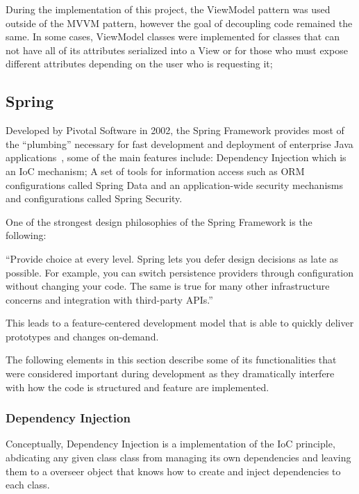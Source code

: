 During the implementation of this project, the ViewModel pattern was used outside of the \gls{MVVM} pattern, however the goal of decoupling code remained the same. In some cases, ViewModel classes were implemented for classes that can not have all of its attributes serialized into a View or for those who must expose different attributes depending on the user who is requesting it; 

\subsection{Spring}\label{concept:spring}
Developed by Pivotal Software in 2002, the Spring Framework provides most of the ``plumbing'' necessary for fast development and deployment of enterprise Java applications~\cite{springdocs}, some of the main features include: Dependency Injection which is an \gls{IoC} mechanism; A set of tools for information access such as \gls{ORM} configurations called Spring Data and an application-wide security mechanisms and configurations called Spring Security.

One of the strongest design philosophies of the Spring Framework is the following:
\begin{displayquote}
``Provide choice at every level. Spring lets you defer design decisions as late as possible. For example, you can switch persistence providers through configuration without changing your code. The same is true for many other infrastructure concerns and integration with third-party \gls{API}s.''~\textcite{springdocs}
\end{displayquote}
This leads to a feature-centered development model that is able to quickly deliver prototypes and changes on-demand.

The following elements in this section describe some of its functionalities that were considered important during development as they dramatically interfere with how the code is structured and feature are implemented.

\subsubsection{Dependency Injection}\label{spring:ds}
Conceptually, Dependency Injection is a implementation of the \gls{IoC} principle, abdicating any given class class from managing its own dependencies and leaving them to a overseer object that knows how to create and inject dependencies to each class\cite{inversion}.


